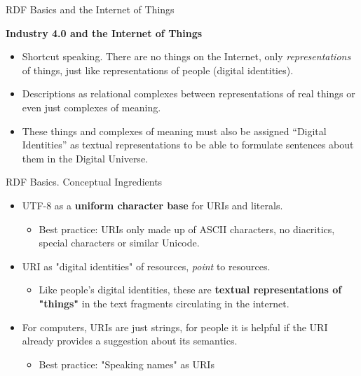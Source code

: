 \documentclass{beamer}
\newcommand{\ueberschrift}[1]{\begin{center}\bf #1\end{center}}
\begin{document}
\begin{frame}{RDF Basics and the Internet of Things}
  \ueberschrift{Industry 4.0 and the Internet of Things}
  \begin{itemize}
  \item Shortcut speaking. There are no things on the Internet, only
    \emph{representations} of things, just like representations of people
    (digital identities).
  \item Descriptions as relational complexes between representations of real
    things or even just complexes of meaning.
  \item These things and complexes of meaning must also be assigned “Digital
    Identities” as textual representations to be able to formulate sentences
    about them in the Digital Universe.
  \end{itemize}
\end{frame}
\begin{frame}{RDF Basics. Conceptual Ingredients}
  \begin{itemize}  
  \item UTF-8 as a \textbf{uniform character base} for URIs and literals.
    \begin{itemize}  
    \item[] Best practice: URIs only made up of ASCII characters, no diacritics,
      special characters or similar Unicode.
    \end{itemize}
  \item URI as "digital identities" of resources, \emph{point} to resources. 
    \begin{itemize}  
    \item[] Like people's digital identities, these are \textbf{textual
      representations of "things"} in the text fragments circulating in the
      internet.
    \end{itemize}
  \item For computers, URIs are just strings, for people it is helpful if the
    URI already provides a suggestion about its semantics. 
    \begin{itemize}  
    \item[] Best practice: "Speaking names" as URIs
    \end{itemize}
  \end{itemize}
\end{frame}
\end{document}
